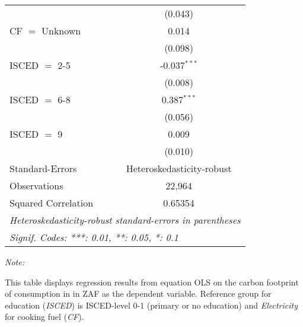 \begin{table}[htbp!]
\begin{adjustbox}{width = 1\textwidth, max height = 0.95\textheight, center}
\begin{threeparttable}[b]
\begin{tabular}{lc}
                                & (0.043)\\   
            CF $=$ Unknown      & 0.014\\   
                                & (0.098)\\   
            ISCED $=$ 2-5       & -0.037$^{***}$\\   
                                & (0.008)\\   
            ISCED $=$ 6-8       & 0.387$^{***}$\\   
                                & (0.056)\\   
            ISCED $=$ 9         & 0.009\\   
                                & (0.010)\\   
            \midrule 
            Standard-Errors     & Heteroskedasticity-robust \\   
            Observations        & 22,964\\  
            Squared Correlation & 0.65354\\  
            \midrule \midrule
            \multicolumn{2}{l}{\emph{Heteroskedasticity-robust standard-errors in parentheses}}\\
            \multicolumn{2}{l}{\emph{Signif. Codes: ***: 0.01, **: 0.05, *: 0.1}}\\
         \end{tabular}
         
         \begin{tablenotes}\item \medskip \textit{Note:}
            \item This table displays regression results from equation OLS on the carbon footprint of consumption in  in ZAF as the dependent variable.  Reference group for education (\textit{ISCED}) is ISCED-level 0-1 (primary or no education) and \textit{Electricity} for cooking fuel (\textit{CF}).
         \end{tablenotes}
      \end{threeparttable}
   \end{adjustbox}
\end{table}


